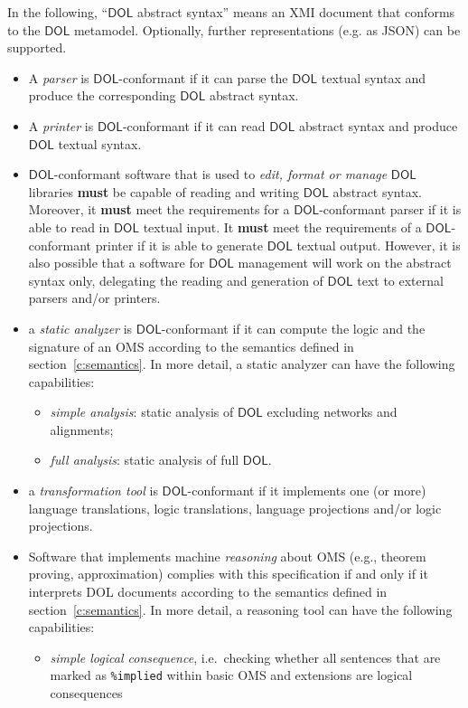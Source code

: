 \documentclass[10pt, a4paper]{isov2}
\newcommand*{\syntax}[1]{\texttt{#1}}
\newcommand*{\hasto}{\textbf{must}\xspace}
\newcommand*{\DOL}{\ensuremath{\mathsf{DOL}}\xspace}
\begin{document}
In the following, ``\DOL abstract syntax'' means an XMI document that
conforms to the \DOL metamodel. Optionally, further representations
(e.g. as JSON) can be supported.
\begin{itemize}
\item
A \emph{parser} is \DOL-conformant if it can parse the \DOL textual syntax and produce the corresponding \DOL abstract syntax.
\item
A \emph{printer} is \DOL-conformant if it can read \DOL abstract syntax and produce \DOL textual syntax.
\item
{\DOL}-conformant software that is used to \emph{edit, format or manage} \DOL libraries \hasto be capable of reading and writing \DOL abstract syntax. Moreover, it \hasto meet the requirements for a \DOL-conformant parser if it is able to read in \DOL textual input. It \hasto meet the requirements of a \DOL-conformant printer if it is able to generate \DOL textual output. However, it is also possible that a software for \DOL management will work on the abstract syntax only, delegating the reading and generation of \DOL text to external parsers and/or printers.
\item a \emph{static analyzer} is \DOL-conformant if it can compute
  the logic and the signature of an OMS according to the semantics
  defined in section~\ref{c:semantics}. In more detail, a static analyzer
  can have the following capabilities:
\begin{itemize}
\item \emph{simple analysis}: static analysis of \DOL excluding networks and alignments;
\item \emph{full analysis}: static analysis of full \DOL.
\end{itemize}
\item a \emph{transformation tool} is \DOL-conformant if it implements
one (or more) language translations, logic translations, language
projections and/or logic projections.
\item
Software that implements machine \emph{reasoning} about OMS (e.g., theorem proving, approximation)  complies with this specification if and only if it interprets  DOL documents according to the semantics defined in section~\ref{c:semantics}. In more detail, a reasoning tool can have the following capabilities:
\begin{itemize}
\item \emph{simple logical consequence}, i.e.\ checking whether all sentences that are marked as \syntax{\%implied} within basic OMS
and extensions are logical consequences

\end{itemize}
\end{itemize}
\end{document}
